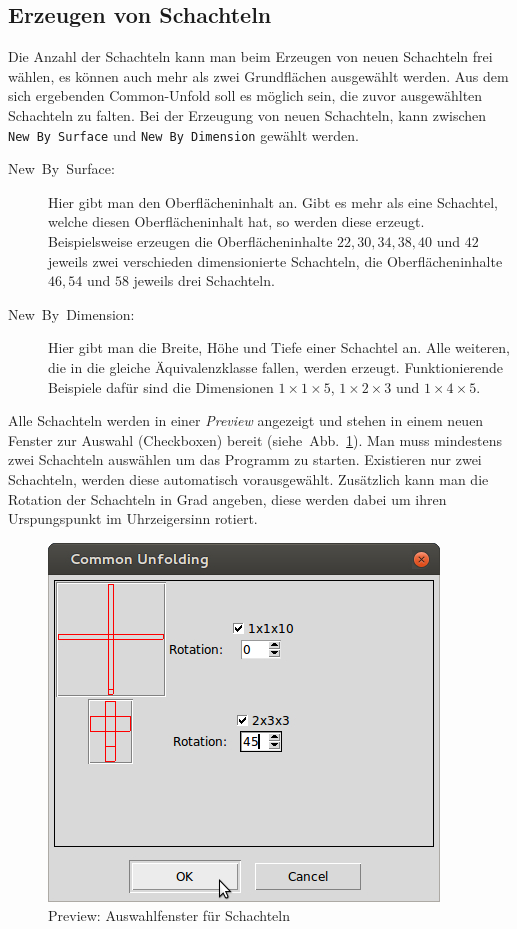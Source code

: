 \subsection{Erzeugen von Schachteln}
\label{subsec:schachteln}

Die Anzahl der Schachteln kann man beim Erzeugen von neuen Schachteln frei wählen, \dH es können auch mehr als zwei Grundflächen ausgewählt werden. Aus dem sich ergebenden Common-Unfold soll es möglich sein, die zuvor ausgewählten Schachteln zu falten. Bei der Erzeugung von neuen Schachteln, kann zwischen \texttt{New By Surface} und \texttt{New By Dimension} gewählt werden.

  \begin{description}
    \item [{New~By~Surface:}] Hier gibt man den Oberflächeninhalt an. Gibt es mehr als eine Schachtel, welche diesen Oberflächeninhalt hat, so werden diese erzeugt. Beispielsweise erzeugen die Oberflächeninhalte $22, 30, 34, 38, 40$ und $42$ jeweils zwei verschieden dimensionierte Schachteln, die Oberflächeninhalte $46, 54$ und $58$ jeweils drei Schachteln.

    \item [{New~By~Dimension:}] Hier gibt man die Breite, Höhe und Tiefe einer Schachtel an. Alle weiteren, die in die gleiche Äquivalenzklasse fallen, werden erzeugt. Funktionierende Beispiele dafür sind die Dimensionen $1\times1\times5$, $1\times2\times3$ und $1\times4\times5$.
  \end{description}

Alle Schachteln werden in einer \emph{Preview} angezeigt und stehen in einem neuen Fenster zur Auswahl (Checkboxen)  bereit (siehe~Abb.~\ref{fig:preview}). Man muss mindestens zwei Schachteln auswählen um das Programm zu starten. Existieren nur zwei Schachteln, werden diese automatisch vorausgewählt. Zusätzlich kann man die Rotation der Schachteln in Grad angeben, diese werden dabei um ihren Urspungspunkt im Uhrzeigersinn rotiert.

\begin{figure}[htbp]
  \centering
  \includegraphics[scale=0.5]{03_pics/auswahl.jpg}
  \caption{Preview: Auswahlfenster für Schachteln}
  \label{fig:preview}
\end{figure}


